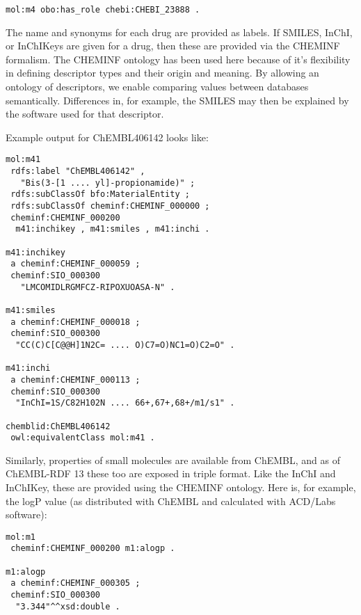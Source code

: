 \documentclass[10pt]{bmc_article}
\newenvironment{bmcformat}{\begin{raggedright}\baselineskip20pt\sloppy\setboolean{publ}{false}}{\end{raggedright}\baselineskip20pt\sloppy}
\begin{document}
\begin{bmcformat}
\begin{small}
\begin{verbatim}
mol:m4 obo:has_role chebi:CHEBI_23888 .
\end{verbatim}
\end{small}

The name and synonyms for each drug are
provided as labels. If SMILES, InChI, or InChIKeys are given for a drug, then these are
provided via the CHEMINF formalism.
The CHEMINF ontology has been used here because of it's flexibility in defining
descriptor types and their origin and meaning. By allowing an ontology of descriptors,
we enable comparing values between databases semantically. Differences in, for example,
the SMILES may then be explained by the software used for that descriptor.

Example output for ChEMBL406142 looks like:

\begin{small}
\begin{verbatim}
mol:m41
 rdfs:label "ChEMBL406142" , 
   "Bis(3-[1 .... yl]-propionamide)" ;
 rdfs:subClassOf bfo:MaterialEntity ;
 rdfs:subClassOf cheminf:CHEMINF_000000 ;
 cheminf:CHEMINF_000200
  m41:inchikey , m41:smiles , m41:inchi .

m41:inchikey
 a cheminf:CHEMINF_000059 ;
 cheminf:SIO_000300
   "LMCOMIDLRGMFCZ-RIPOXUOASA-N" .

m41:smiles
 a cheminf:CHEMINF_000018 ;
 cheminf:SIO_000300
  "CC(C)C[C@@H]1N2C= .... O)C7=O)NC1=O)C2=O" .

m41:inchi
 a cheminf:CHEMINF_000113 ;
 cheminf:SIO_000300
  "InChI=1S/C82H102N .... 66+,67+,68+/m1/s1" .

chemblid:ChEMBL406142
 owl:equivalentClass mol:m41 .
\end{verbatim}
\end{small}

Similarly, properties of small molecules are available from ChEMBL, and as of ChEMBL-RDF 13
these too are exposed in triple format. Like the InChI and InChIKey, these are provided using the
CHEMINF ontology. Here is, for example, the logP value (as distributed with ChEMBL and
calculated with ACD/Labs software):

\begin{small}
\begin{verbatim}
mol:m1
 cheminf:CHEMINF_000200 m1:alogp .

m1:alogp
 a cheminf:CHEMINF_000305 ;
 cheminf:SIO_000300
  "3.344"^^xsd:double .
\end{verbatim}
\end{small}


\end{bmcformat}
\end{document}

